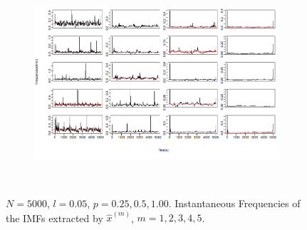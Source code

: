 \documentclass[11pt, a4paper]{article} %
\begin{document}
\begin{figure}
\begin{subfigure}{1.1\textwidth}
  \centering
  \includegraphics[width=\linewidth]{IF_N5000_l005_m_1_5.png}
  \label{fig:sfig1}
\end{subfigure}\\
\label{fig1}
\caption{$N = 5000$, $l =0.05$, $p = 0.25, 0.5, 1.00$. Instantaneous Frequencies of the IMFs extracted by $\hat{x}^{(m)}$, $m = 1,2,3,4,5$.}
\end{figure}

\restoregeometry




\end{document}
